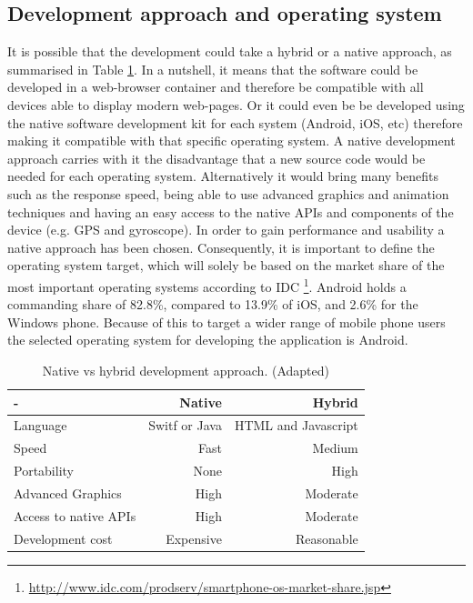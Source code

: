 \subsection{Development approach and operating system}
It is possible that the development could take a hybrid or a native approach, as summarised in Table \ref{tab:development_approaches}. In a nutshell, it means that the software could be developed in a web-browser container and therefore be compatible with all devices able to display modern web-pages. Or it could even be be developed using the native software development kit for each system (Android, iOS, etc) therefore making it compatible with that specific operating system. A native development approach carries with it the disadvantage that a new source code would be needed for each operating system. Alternatively it would bring many benefits such as the response speed, being able to use advanced graphics and animation techniques and having an easy access to the native APIs and components of the device (e.g. GPS and gyroscope). In order to gain performance and usability a native approach has been chosen. Consequently, it is important to define the operating system target, which will solely be based on the market share of the most important operating systems according to IDC \footnote{\url{http://www.idc.com/prodserv/smartphone-os-market-share.jsp}}. Android holds a commanding share of 82.8\%, compared to 13.9\% of iOS, and 2.6\% for the Windows phone. Because of this to target a wider range of mobile phone users the selected operating system for developing the application is Android.

\begin{table}[ht]
\centering
\begin{adjustbox}{width=.6\textwidth,center=\textwidth}
\begin{tabular}{lrr}
  \hline
   - & Native & Hybrid  \\ \hline
   Language & Switf or Java & HTML and Javascript \\
   Speed & Fast & Medium \\
   Portability & None & High \\
   Advanced Graphics & High & Moderate \\
   Access to native APIs & High & Moderate \\
   Development cost & Expensive & Reasonable \\
   \hline
\end{tabular}
\end{adjustbox}
  \caption[Native vs hybrid development approach ]{Native vs hybrid development approach. (Adapted) \footnotemark }
\label{tab:development_approaches}
\end{table} 

